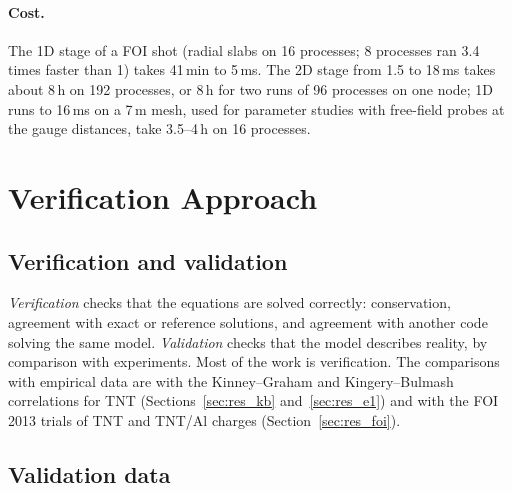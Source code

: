 \documentclass{article}
\begin{document}
\paragraph{Cost.} The 1D stage of a FOI shot (radial slabs on 16 processes; 8 processes ran 3.4 times faster than 1) takes 41\,min to 5\,ms. The 2D stage from 1.5 to 18\,ms takes about 8\,h on 192 processes, or 8\,h for two runs of 96 processes on one node; 1D runs to 16\,ms on a 7\,m mesh, used for parameter studies with free-field probes at the gauge distances, take 3.5--4\,h on 16 processes.

\section{Verification Approach}
\label{sec:verification}

\subsection{Verification and validation}

\emph{Verification} checks that the equations are solved correctly: conservation, agreement with exact or reference solutions, and agreement with another code solving the same model. \emph{Validation} checks that the model describes reality, by comparison with experiments. Most of the work is verification. The comparisons with empirical data are with the Kinney--Graham and Kingery--Bulmash correlations for TNT (Sections~\ref{sec:res_kb} and~\ref{sec:res_e1}) and with the FOI 2013 trials of TNT and TNT/Al charges (Section~\ref{sec:res_foi}).

\subsection{Validation data}
\label{sec:datasets}
\end{document}
